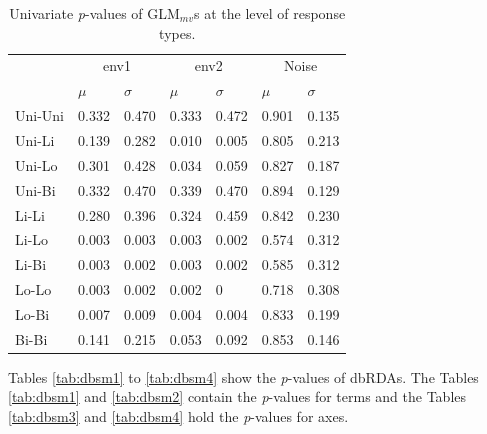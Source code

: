 		\begin{table}[h!] 
				
			\small
			\caption{Univariate \textit{p}-values of GLM$_{mv}$s at the level of response types.}
			\centering
				
			\begin{tabular}{@{}lllllll@{}}
				\toprule
				& \multicolumn{2}{c}{env1} & \multicolumn{2}{c}{env2} & \multicolumn{2}{c}{Noise}\\ \cmidrule(l){2-3} \cmidrule(l){4-5} \cmidrule(l){6-7}
				& $\mu$ & $\sigma$ & $\mu$ & $\sigma$ & $\mu$ & $\sigma$\\
				\hline
				Uni-Uni & 0.332 & 0.470 & 0.333 & 0.472 & 0.901 & 0.135 \\
				Uni-Li  & 0.139 & 0.282 & 0.010 & 0.005 & 0.805 & 0.213 \\
				Uni-Lo  & 0.301 & 0.428 & 0.034 & 0.059 & 0.827 & 0.187 \\
				Uni-Bi  & 0.332 & 0.470 & 0.339 & 0.470 & 0.894 & 0.129 \\
				Li-Li   & 0.280 & 0.396 & 0.324 & 0.459 & 0.842 & 0.230 \\
				Li-Lo   & 0.003 & 0.003 & 0.003 & 0.002 & 0.574 & 0.312 \\
				Li-Bi   & 0.003 & 0.002 & 0.003 & 0.002 & 0.585 & 0.312 \\
				Lo-Lo   & 0.003 & 0.002 & 0.002 & 0     & 0.718 & 0.308 \\
				Lo-Bi   & 0.007 & 0.009 & 0.004 & 0.004 & 0.833 & 0.199 \\
					Bi-Bi   & 0.141 & 0.215 & 0.053 & 0.092 & 0.853 & 0.146 \\
				\toprule
			\end{tabular}
				
			\label{tab:GLMUNI2}
			
		\end{table}
		
		Tables \ref{tab:dbsm1} to \ref{tab:dbsm4} show the \textit{p}-values of dbRDAs. 
		The Tables \ref{tab:dbsm1} and \ref{tab:dbsm2} contain the \textit{p}-values for terms and the Tables \ref{tab:dbsm3} and \ref{tab:dbsm4} hold the \textit{p}-values for axes.
		\vspace{5em}
		
		

